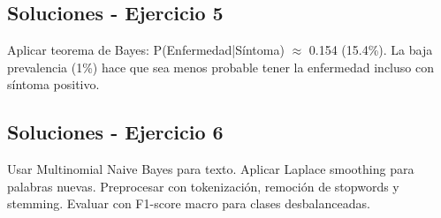 \documentclass[12pt]{article}
\begin{document}
\subsection{Soluciones - Ejercicio 5}

Aplicar teorema de Bayes: P(Enfermedad|Síntoma) $\approx$ 0.154 (15.4\%). La baja prevalencia (1\%) hace que sea menos probable tener la enfermedad incluso con síntoma positivo.

\subsection{Soluciones - Ejercicio 6}

Usar Multinomial Naive Bayes para texto. Aplicar Laplace smoothing para palabras nuevas. Preprocesar con tokenización, remoción de stopwords y stemming. Evaluar con F1-score macro para clases desbalanceadas.
\end{document}
